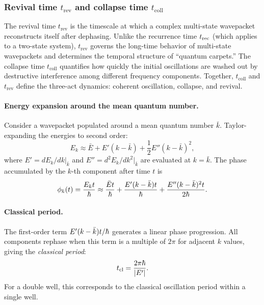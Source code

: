 \subsubsection{Revival time $t_{\text{rev}}$ and collapse time $t_{\text{coll}}$}\label{sec:revival}

\begin{remark}
The revival time $t_{\text{rev}}$ is the timescale at which a complex multi-state wavepacket reconstructs itself after dephasing.
Unlike the recurrence time $t_{\text{rec}}$ (which applies to a two-state system), $t_{\text{rev}}$ governs the long-time behavior of multi-state wavepackets and determines the temporal structure of ``quantum carpets.''
The collapse time $t_{\text{coll}}$ quantifies how quickly the initial oscillations are washed out by destructive interference among different frequency components.
Together, $t_{\text{coll}}$ and $t_{\text{rev}}$ define the three-act dynamics: coherent oscillation, collapse, and revival.
\end{remark}

\paragraph{Energy expansion around the mean quantum number.}

Consider a wavepacket populated around a mean quantum number $\bar{k}$.
Taylor-expanding the energies to second order:
\begin{equation}\label{eq:E_taylor}
  E_k \approx \bar{E} + E'(k - \bar{k}) + \frac{1}{2}E''(k - \bar{k})^2,
\end{equation}
where $E' = dE_k/dk|_{\bar{k}}$ and $E'' = d^2E_k/dk^2|_{\bar{k}}$ are evaluated at $k = \bar{k}$.
The phase accumulated by the $k$-th component after time $t$ is
\begin{equation}\label{eq:phase_k}
  \phi_k(t) = \frac{E_k t}{\hbar} \approx \frac{\bar{E}t}{\hbar} + \frac{E'(k-\bar{k})t}{\hbar} + \frac{E''(k-\bar{k})^2 t}{2\hbar}.
\end{equation}

\paragraph{Classical period.}

The first-order term $E'(k-\bar{k})t/\hbar$ generates a linear phase progression.
All components rephase when this term is a multiple of $2\pi$ for adjacent $k$ values, giving the \emph{classical period}:
\begin{equation}\label{eq:t_cl}
  t_{\text{cl}} = \frac{2\pi\hbar}{|E'|}.
\end{equation}
For a double well, this corresponds to the classical oscillation period within a single well.

